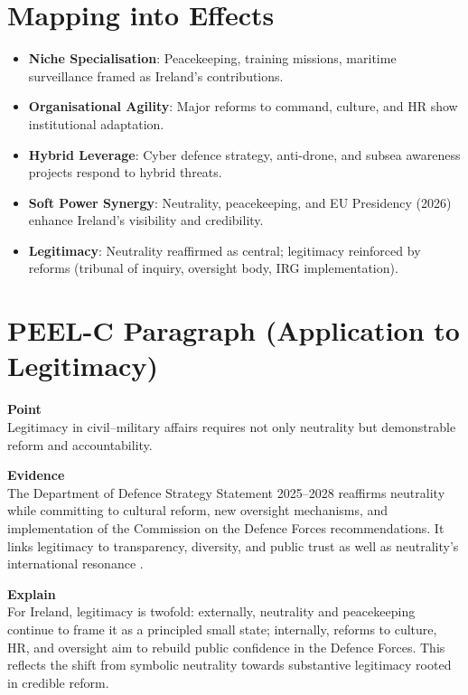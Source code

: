 \section*{Mapping into Effects}

\begin{itemize}
	\item \textbf{Niche Specialisation}: Peacekeeping, training missions, maritime surveillance framed as Ireland’s contributions.
	\item \textbf{Organisational Agility}: Major reforms to command, culture, and HR show institutional adaptation.
	\item \textbf{Hybrid Leverage}: Cyber defence strategy, anti-drone, and subsea awareness projects respond to hybrid threats.
	\item \textbf{Soft Power Synergy}: Neutrality, peacekeeping, and EU Presidency (2026) enhance Ireland’s visibility and credibility.
	\item \textbf{Legitimacy}: Neutrality reaffirmed as central; legitimacy reinforced by reforms (tribunal of inquiry, oversight body, IRG implementation).
\end{itemize}

\section*{PEEL-C Paragraph (Application to Legitimacy)}

\textbf{Point} \\
Legitimacy in civil–military affairs requires not only neutrality but demonstrable reform and accountability.  

\textbf{Evidence} \\
The Department of Defence Strategy Statement 2025--2028 reaffirms neutrality while committing to cultural reform, new oversight mechanisms, and implementation of the Commission on the Defence Forces recommendations. It links legitimacy to transparency, diversity, and public trust as well as neutrality’s international resonance \parencite{DOD_2025}.  

\textbf{Explain} \\
For Ireland, legitimacy is twofold: externally, neutrality and peacekeeping continue to frame it as a principled small state; internally, reforms to culture, HR, and oversight aim to rebuild public confidence in the Defence Forces. This reflects the shift from symbolic neutrality towards substantive legitimacy rooted in credible reform.  

